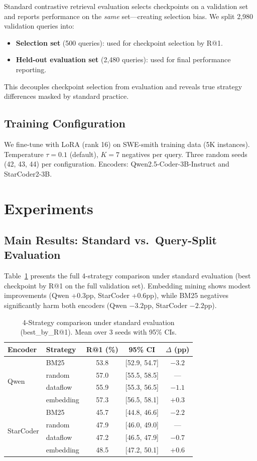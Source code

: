\documentclass[11pt,a4paper]{article}
\begin{document}
Standard contrastive retrieval evaluation selects checkpoints on a validation set and reports performance on the \emph{same} set---creating selection bias. We split 2,980 validation queries into:
\begin{itemize}
\item \textbf{Selection set} (500 queries): used for checkpoint selection by R@1.
\item \textbf{Held-out evaluation set} (2,480 queries): used for final performance reporting.
\end{itemize}
This decouples checkpoint selection from evaluation and reveals true strategy differences masked by standard practice.

\subsection{Training Configuration}

We fine-tune with LoRA (rank 16) on SWE-smith training data (5K instances). Temperature $\tau=0.1$ (default), $K=7$ negatives per query. Three random seeds (42, 43, 44) per configuration. Encoders: Qwen2.5-Coder-3B-Instruct and StarCoder2-3B.

\section{Experiments}

\subsection{Main Results: Standard vs.\ Query-Split Evaluation}
\label{sec:main}

Table~\ref{tab:main_standard} presents the full 4-strategy comparison under standard evaluation (best checkpoint by R@1 on the full validation set). Embedding mining shows modest improvements (Qwen +0.3pp, StarCoder +0.6pp), while BM25 negatives significantly harm both encoders (Qwen $-3.2$pp, StarCoder $-2.2$pp).

\begin{table}[t]
\centering
\small
\caption{4-Strategy comparison under standard evaluation (best\_by\_R@1). Mean over 3 seeds with 95\% CIs.}
\label{tab:main_standard}
\begin{tabular}{llccc}
\toprule
Encoder & Strategy & R@1 (\%) & 95\% CI & $\Delta$ (pp) \\
\midrule
\multirow{4}{*}{Qwen} & BM25 & 53.8 & [52.9, 54.7] & $-3.2$ \\
& random & 57.0 & [55.5, 58.5] & --- \\
& dataflow & 55.9 & [55.3, 56.5] & $-1.1$ \\
& embedding & 57.3 & [56.5, 58.1] & $+0.3$ \\
\midrule
\multirow{4}{*}{StarCoder} & BM25 & 45.7 & [44.8, 46.6] & $-2.2$ \\
& random & 47.9 & [46.0, 49.0] & --- \\
& dataflow & 47.2 & [46.5, 47.9] & $-0.7$ \\
& embedding & 48.5 & [47.2, 50.1] & $+0.6$ \\
\bottomrule
\end{tabular}
\end{table}
\end{document}
